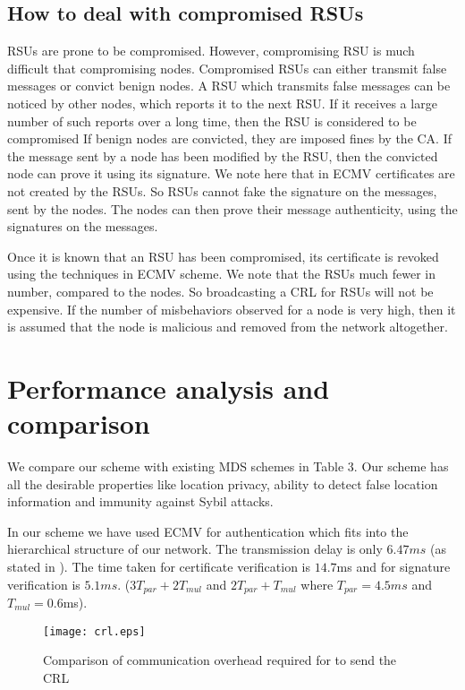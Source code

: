\documentclass[conference]{IEEEtran}[10pt]
\begin{document}
\subsection{How to deal with compromised RSUs}
RSUs are prone to be compromised.
However, compromising RSU is much difficult that compromising nodes.  
Compromised RSUs can either transmit false messages or convict benign nodes.
A RSU which transmits false messages can be noticed by other nodes, which reports it to the next RSU. 
If it receives a large number  of such reports over a long time, then the RSU is considered to be compromised
If benign nodes are convicted, they are imposed fines by the CA. 
If the message sent by a node has been modified by the RSU, then  the convicted node can prove it using its signature. 
We note here that in ECMV certificates are not created by the RSUs. So RSUs cannot fake the signature on the messages, sent by the nodes.
The nodes can then prove their message authenticity, using the signatures on the messages. 

Once it is known that an RSU has been compromised, its certificate is revoked using the techniques in ECMV scheme. 
We note that the RSUs much fewer in number, compared to the nodes. So
broadcasting a CRL for RSUs will not be expensive. 
If the number of misbehaviors observed for a node is very high, then it is assumed that the node is 
malicious and removed from the network altogether. 



\section{Performance analysis and comparison}
We compare our scheme with existing MDS schemes in Table 3. 
Our scheme has all the desirable 
properties like location  privacy, ability to detect false location information and immunity against Sybil attacks. 



In our scheme we have used ECMV \cite{WJS08} for authentication which fits into the hierarchical
structure of our network. 
The transmission delay is only $6.47ms$ (as stated in \cite{WJS08}). 
The time taken for certificate verification is
$14.7$ms and for signature verification is $5.1ms$. 
($3T_{par} + 2T_{mul}$ and $2T_{par} + T_{mul}$ where $T_{par} = 4.5ms$ and $T_{mul}= 0.6$ms). 

\begin{figure}[htb]
\begin{centering}
\texttt{[image: crl.eps]}
\caption{
Comparison of communication overhead required for to send the CRL}
\label{fig:compare}
\end{centering}
\end{figure}
\end{document}
